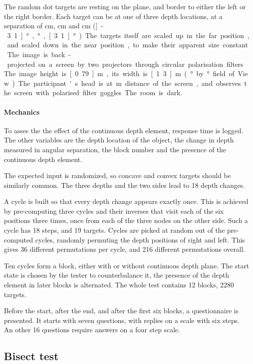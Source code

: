 The random dot targets are resting on the plane, and border to either the left or the right border.
Each target can be at  one of three depth locations, at a separation of \unit[6]{cm}, \unit[0]{cm} and \unit[-6]{cm} (\unit[-3.1]{°}, \unit[0]{°}, \unit[3.1]{°}).
The targets itself are scaled up in the far position, and scaled down in the near position, to make their apparent size constant.

The image is back-projected on a screen by two projectors through circular polarisation filters.
The image height is \unit[0.79]{m}, its width is \unit[1.3]{m} (\unit[36]{°} by \unit[22]{°} field of View).
The participant's head is at \unit[2]{m} distance of the screen, and observes the screen with polarised filter goggles. The room is dark.

\paragraph{Mechanics}
To asses the the effect of the continuous depth element, response time is logged.
The other variables are the depth location of the object, the change in depth measured in angular separation, the block number and the presence of the continuous depth element.

The expected input is randomized, so concave and convex targets should be similarly common.
The three depths and the two sides lead to 18 depth changes.

A cycle is built so that every depth change appears exactly once.
This is achieved by pre-computing three cycles and their inverses that visit each of the six positions three times, once from each of the three nodes on the other side.
Such a cycle has 18 steps, and 19 targets.
Cycles are picked at random out of the pre-computed cycles, randomly permuting the depth positions of right and left.
This gives 36 different permutations per cycle, and 216 different permutations overall.

Ten cycles form a block, either with or without continuous depth plane.
The start state is chosen by the tester to counterbalance it, the presence of the depth element in later blocks is alternated.
The whole test contains 12 blocks, 2280 targets.

Before the start, after the end, and after the first six blocks, a questionnaire is presented.
It starts with seven questions, with replies on a scale with six steps.
An other 16 questions require answers on a four step scale.


\subsection{Bisect test\label{Bisect}}
